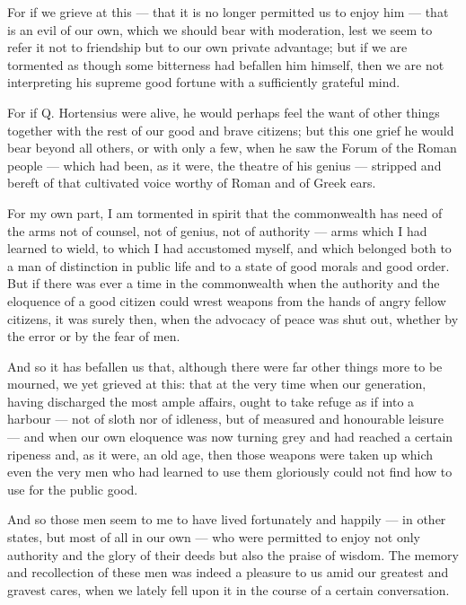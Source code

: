  For if we grieve at this — that it is no longer permitted us to enjoy him — that is an evil of our own, which we should bear with moderation, lest we seem to refer it not to friendship but to our own private advantage; but if we are tormented as though some bitterness had befallen him himself, then we are not interpreting his supreme good fortune with a sufficiently grateful mind.

 For if Q. Hortensius were alive, he would perhaps feel the want of other things together with the rest of our good and brave citizens; but this one grief he would bear beyond all others, or with only a few, when he saw the Forum of the Roman people — which had been, as it were, the theatre of his genius — stripped and bereft of that cultivated voice worthy of Roman and of Greek ears.

 For my own part, I am tormented in spirit that the commonwealth has need of the arms not of counsel, not of genius, not of authority — arms which I had learned to wield, to which I had accustomed myself, and which belonged both to a man of distinction in public life and to a state of good morals and good order. But if there was ever a time in the commonwealth when the authority and the eloquence of a good citizen could wrest weapons from the hands of angry fellow citizens, it was surely then, when the advocacy of peace was shut out, whether by the error or by the fear of men.

 And so it has befallen us that, although there were far other things more to be mourned, we yet grieved at this: that at the very time when our generation, having discharged the most ample affairs, ought to take refuge as if into a harbour — not of sloth nor of idleness, but of measured and honourable leisure — and when our own eloquence was now turning grey and had reached a certain ripeness and, as it were, an old age, then those weapons were taken up which even the very men who had learned to use them gloriously could not find how to use for the public good.

 And so those men seem to me to have lived fortunately and happily — in other states, but most of all in our own — who were permitted to enjoy not only authority and the glory of their deeds but also the praise of wisdom. The memory and recollection of these men was indeed a pleasure to us amid our greatest and gravest cares, when we lately fell upon it in the course of a certain conversation.

